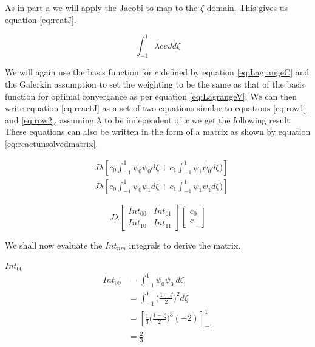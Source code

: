 \documentclass[11pt]{article}
\begin{document}
As in part a we will apply the Jacobi to map to the $\zeta$ domain. This gives us equation \ref{eq:reatJ}.

\begin{equation} \label{eq:reactJ}
\int_{-1}^1 \lambda c v J d\zeta
\end{equation}

We will again use the basis function for $c$ defined by equation \ref{eq:LagrangeC} and the Galerkin assumption to set the weighting to be the same as that of the basis function for optimal convergance as per equation \ref{eq:LagrangeV}. We can then write equation \ref{eq:reactJ} as a set of two equations similar to equations \ref{eq:row1} and \ref{eq:row2}, assuming $\lambda$ to be independent of $x$ we get the following result. These equations can also be written in the form of a matrix as shown by equation \ref{eq:reactunsolvedmatrix}.

\begin{subequations}
\label{eq:reactmatrixform}
\begin{align}
&J \lambda \left  [c_0 \int_{-1}^{1} \psi_{0} \psi_{0} d \zeta + c_1 \int_{-1}^{1} \psi_{1} \psi_{0} d\zeta ) \right ] \label{eq:reactrow1} \\
&J \lambda \left  [c_0 \int_{-1}^{1} \psi_{0} \psi_{1} d \zeta + c_1 \int_{-1}^{1} \psi_{1} \psi_{1} d\zeta ) \right ]  \label{eq:reactrow2} 
\end{align}
\end{subequations}



\begin{equation} \label{eq:reactunsolvedmatrix}
J \lambda
\begin{bmatrix}

Int_{00} & Int_{01} \\
Int_{10} & Int_{11}
\end{bmatrix}
\begin{bmatrix}

c_{0} \\  c_{1} 
\end{bmatrix}
\end{equation}

We shall now evaluate the $Int_{nm}$ integrals to derive the matrix.

\underline{$Int_{00}$} \\
\begin{equation}\label{eq:Int00}
\begin{split}
 Int_{00} &= \int_{-1}^{1} \psi_{0}\psi_{0} \ d \zeta \\
&=  \int_{-1}^{1}  \Big ( \frac{1-\zeta}{2} \Big )^2 d\zeta \\
& = \left[ \frac{1}{3} \Big ( \frac{1-\zeta}{2} \Big )^3 (-2) \right]_{-1}^{1} \\
& = \frac{2}{3}
\end{split}
\end{equation}
\end{document}
